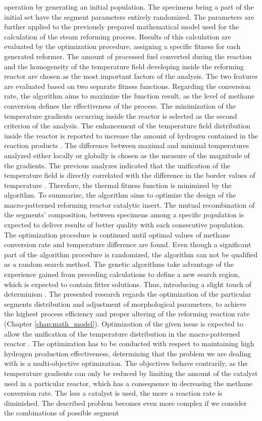 \documentclass[preprint,12pt]{elsarticle}
\begin{document}
operation by generating an initial population. The specimens being a part of the initial set have the segment parameters entirely randomized. The parameters are further applied to the previously prepared mathematical model used for the calculation of the steam reforming process. Results of this calculation are evaluated by the optimization procedure, assigning a specific fitness for each generated reformer. The amount of processed fuel converted during the reaction and the homogeneity of the temperature field developing inside the reforming reactor are chosen as the most important factors of the analysis. The two features are evaluated based on two separate fitness functions. Regarding the conversion rate, the algorithm aims to maximize the function result, as the level of methane conversion defines the effectiveness of the process. The minimization of the temperature gradients occurring inside the reactor is selected as the second criterion of the analysis. The enhancement of the temperature field distribution inside the reactor is reported to increase the amount of hydrogen contained in the reaction products \cite{Palma2017}. The difference between maximal and minimal temperatures analyzed either locally or globally is chosen as the measure of the magnitude of the gradients.  The previous analyzes indicated that the unification of the temperature field is directly correlated with the difference in the border values of temperature \cite{Pajak2018}. Therefore, the thermal fitness function is minimized by the algorithm. To summarize, the algorithm aims to optimize the design of the macro-patterned reforming reactor catalytic insert. The mutual recombination of the segments’ composition, between specimens among a specific population is expected to deliver results of better quality with each consecutive population. The optimization procedure is continued until optimal values of methane conversion rate and temperature difference are found. Even though a significant part of the algorithm procedure is randomized, the algorithm can not be qualified as a random search method. The genetic algorithms take advantage of the experience gained from preceding calculations to define a new search region, which is expected to contain fitter solutions. Thus, introducing a slight touch of determinism \cite{Goldberg1989}. The presented research regards the optimization of the particular segments distribution and adjustment of morphological parameters, to achieve the highest process efficiency and proper altering of the reforming reaction rate (Chapter \ref{chap:math_model}). Optimization of the given issue is expected to allow the unification of the temperature distribution in the macro-patterned reactor \cite{Pajak2018}. The optimization has to be conducted with respect to maintaining high hydrogen production effectiveness, determining that the problem we are dealing with is a multi-objective optimization. The objectives behave contrarily, as the temperature gradients can only be reduced by limiting the amount of the catalyst used in a particular reactor, which has a consequence in decreasing the methane conversion rate. The less a catalyst is used, the more a reaction rate is diminished. The described problem becomes even more complex if we consider the combinations of possible segment 
\end{document}
